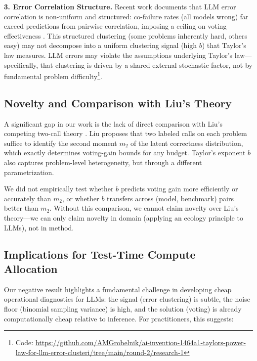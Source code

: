 \documentclass[11pt,letterpaper]{article}
\begin{document}
\textbf{3. Error Correlation Structure.} Recent work documents that LLM error correlation is non-uniform and structured: co-failure rates (all models wrong) far exceed predictions from pairwise correlation, imposing a ceiling on voting effectiveness \citep{Chen2026}. This structured clustering (some problems inherently hard, others easy) may not decompose into a uniform clustering signal (high $b$) that Taylor's law measures. LLM errors may violate the assumptions underlying Taylor's law---specifically, that clustering is driven by a shared external stochastic factor, not by fundamental problem difficulty\footnote{Code: \url{https://github.com/AMGrobelnik/ai-invention-1464a1-taylors-power-law-for-llm-error-clusteri/tree/main/round-2/research-1}}.

\subsection{Novelty and Comparison with Liu's Theory}

A significant gap in our work is the lack of direct comparison with Liu's competing two-call theory \citep{Liu2026moments}. Liu proposes that two labeled calls on each problem suffice to identify the second moment $m_2$ of the latent correctness distribution, which exactly determines voting-gain bounds for any budget. Taylor's exponent $b$ also captures problem-level heterogeneity, but through a different parametrization.

We did not empirically test whether $b$ predicts voting gain more efficiently or accurately than $m_2$, or whether $b$ transfers across (model, benchmark) pairs better than $m_2$. Without this comparison, we cannot claim novelty over Liu's theory---we can only claim novelty in domain (applying an ecology principle to LLMs), not in method.

\subsection{Implications for Test-Time Compute Allocation}

Our negative result highlights a fundamental challenge in developing cheap operational diagnostics for LLMs: the signal (error clustering) is subtle, the noise floor (binomial sampling variance) is high, and the solution (voting) is already computationally cheap relative to inference. For practitioners, this suggests:
\end{document}
